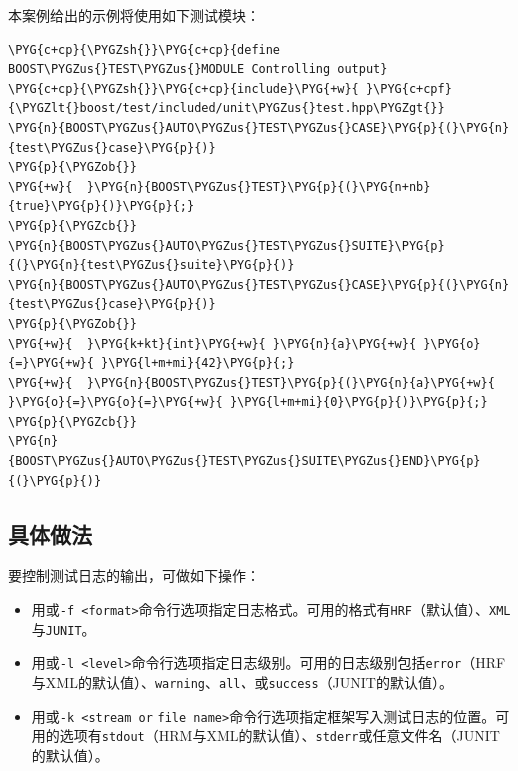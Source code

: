 
本案例给出的示例将使用如下测试模块：



\begin{codeblockbg}
\begin{Verbatim}[commandchars=\\\{\},breaklines=true,breakanywhere=true,fontsize=\codefont,xleftmargin=17bp]
\PYG{c+cp}{\PYGZsh{}}\PYG{c+cp}{define BOOST\PYGZus{}TEST\PYGZus{}MODULE Controlling output}
\PYG{c+cp}{\PYGZsh{}}\PYG{c+cp}{include}\PYG{+w}{ }\PYG{c+cpf}{\PYGZlt{}boost/test/included/unit\PYGZus{}test.hpp\PYGZgt{}}
\PYG{n}{BOOST\PYGZus{}AUTO\PYGZus{}TEST\PYGZus{}CASE}\PYG{p}{(}\PYG{n}{test\PYGZus{}case}\PYG{p}{)}
\PYG{p}{\PYGZob{}}
\PYG{+w}{  }\PYG{n}{BOOST\PYGZus{}TEST}\PYG{p}{(}\PYG{n+nb}{true}\PYG{p}{)}\PYG{p}{;}
\PYG{p}{\PYGZcb{}}
\PYG{n}{BOOST\PYGZus{}AUTO\PYGZus{}TEST\PYGZus{}SUITE}\PYG{p}{(}\PYG{n}{test\PYGZus{}suite}\PYG{p}{)}
\PYG{n}{BOOST\PYGZus{}AUTO\PYGZus{}TEST\PYGZus{}CASE}\PYG{p}{(}\PYG{n}{test\PYGZus{}case}\PYG{p}{)}
\PYG{p}{\PYGZob{}}
\PYG{+w}{  }\PYG{k+kt}{int}\PYG{+w}{ }\PYG{n}{a}\PYG{+w}{ }\PYG{o}{=}\PYG{+w}{ }\PYG{l+m+mi}{42}\PYG{p}{;}
\PYG{+w}{  }\PYG{n}{BOOST\PYGZus{}TEST}\PYG{p}{(}\PYG{n}{a}\PYG{+w}{ }\PYG{o}{=}\PYG{o}{=}\PYG{+w}{ }\PYG{l+m+mi}{0}\PYG{p}{)}\PYG{p}{;}
\PYG{p}{\PYGZcb{}}
\PYG{n}{BOOST\PYGZus{}AUTO\PYGZus{}TEST\PYGZus{}SUITE\PYGZus{}END}\PYG{p}{(}\PYG{p}{)}
\end{Verbatim}
\end{codeblockbg}



\subsection{具体做法}



要控制测试日志的输出，可做如下操作：



\begin{itemize}
\item 用或\texttt{-\allowbreak{}f <\allowbreak{}format>}命令行选项指定日志格式。可用的格式有\texttt{HRF}（默认值）、\texttt{XML}与\texttt{JUNIT}。



\item 用或\texttt{-\allowbreak{}l <\allowbreak{}level>}命令行选项指定日志级别。可用的日志级别包括\texttt{error}（HRF与XML的默认值）、\texttt{warning}、\texttt{all}\textit{、}或\texttt{success}（JUNIT的默认值）。



\item 用或\texttt{-\allowbreak{}k <\allowbreak{}stream or} \texttt{file name>}命令行选项指定框架写入测试日志的位置。可用的选项有\texttt{stdout}（HRM与XML的默认值）、\texttt{stderr}或任意文件名（JUNIT的默认值）。

\end{itemize}


